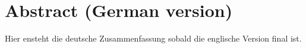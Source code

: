 


\chapter*{Abstract (German version)}

\begin{otherlanguage}{ngerman}
  Hier ensteht die deutsche Zusammenfassung sobald die englische Version final
  ist.
\end{otherlanguage}
